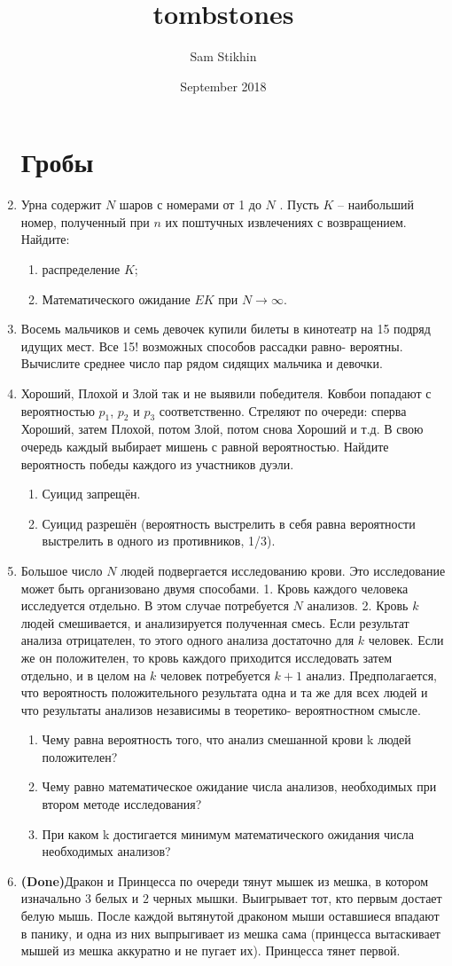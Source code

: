 \documentclass[a4paper, 14pt]{extarticle}
\title{tombstones}
\author{Sam Stikhin}
\date{September 2018}
\begin{document}
\begin{enumerate}
\section*{Гробы}
	\item  Урна содержит $N$ шаров с номерами от 1 до $N$ . Пусть $K$ --
наибольший номер, полученный при $n$ их поштучных извлечениях с
возвращением. Найдите:	\begin{enumerate}
	\item  распределение $K$;
	\item Математического ожидание $EK$ при $N\rightarrow\infty$.
\end{enumerate}
    \item Восемь мальчиков и семь девочек купили билеты в кинотеатр на
	15 подряд идущих мест. Все 15! возможных способов рассадки равно-
	вероятны. Вычислите среднее число пар рядом сидящих мальчика и
	девочки.
\item Хороший, Плохой и Злой так и не выявили победителя. Ковбои попадают с вероятностью $p_1$, $p_2$ и $p_3$ соответственно. Стреляют по очереди: сперва Хороший, затем Плохой, потом Злой, потом снова Хороший и т.д. В свою очередь каждый выбирает мишень с равной вероятностью. Найдите вероятность победы каждого из участников дуэли.
\begin{enumerate}
    \item Суицид запрещён.
    \item Суицид разрешён (вероятность выстрелить в себя равна вероятности выстрелить в одного из противников, 1/3).
\end{enumerate}
\item  Большое число $N$ людей подвергается исследованию
	крови. Это исследование может быть организовано двумя
	способами. 1. Кровь каждого человека исследуется отдельно.
	В этом случае потребуется $N$ анализов. 2. Кровь $k$ людей
	смешивается, и анализируется полученная смесь. Если  
	результат анализа отрицателен, то этого одного анализа  
	достаточно для $k$ человек. Если же он положителен, то кровь  
	каждого приходится исследовать затем отдельно, и в целом на $k$
	человек потребуется $k+1$ анализ. Предполагается, что  
	вероятность положительного результата одна и та же для всех
	людей и что результаты анализов независимы в теоретико-
	вероятностном смысле.
	\begin{enumerate}
		\item Чему равна вероятность того, что анализ смешанной
	крови k людей положителен?
	\item Чему равно математическое ожидание числа анализов, необходимых при
	втором методе исследования?
	\item При каком k достигается минимум математического ожидания числа  
	необходимых анализов?
	\end{enumerate}
 \item \textbf{(Done)}Дракон и Принцесса по очереди тянут мышек из мешка, в котором изначально $3$ белых и $2$ черных мышки. Выигрывает тот, кто первым достает белую мышь. После каждой вытянутой драконом мыши оставшиеся впадают в панику, и одна из них выпрыгивает из мешка сама (принцесса вытаскивает мышей из мешка аккуратно и не пугает их). Принцесса тянет первой.


\end{enumerate}
\end{document}
